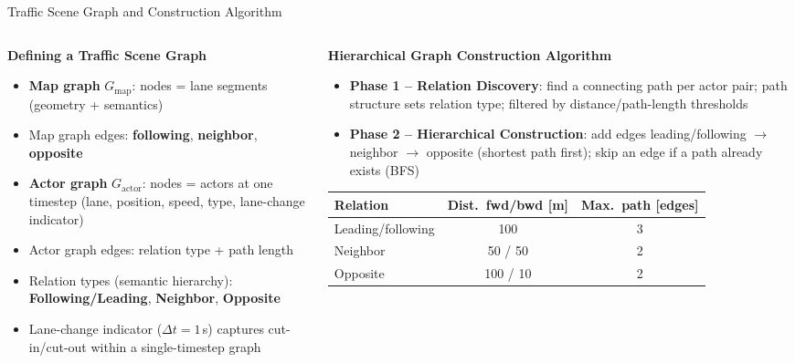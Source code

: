 \documentclass[aspectratio=169]{beamer}
\begin{document}
\begin{frame}{Traffic Scene Graph and Construction Algorithm}
\begin{columns}[t]
\begin{column}{0.5\textwidth}
\textbf{\footnotesize Defining a Traffic Scene Graph}
\begin{itemize}[itemsep=1pt,topsep=1pt,parsep=0pt]
    \scriptsize
    \item \textbf{Map graph} $G_{\text{map}}$: nodes = lane segments (geometry + semantics)
    \item Map graph edges: \textbf{following}, \textbf{neighbor}, \textbf{opposite}
    \item \textbf{Actor graph} $G_{\text{actor}}$: nodes = actors at one timestep (lane, position, speed, type, lane-change indicator)
    \item Actor graph edges: relation type + path length
    \item Relation types (semantic hierarchy): \textbf{Following/Leading}, \textbf{Neighbor}, \textbf{Opposite}
    \item Lane-change indicator ($\Delta t = 1$\,s) captures cut-in/cut-out within a single-timestep graph
\end{itemize}
\end{column}
\begin{column}{0.5\textwidth}
\textbf{\footnotesize Hierarchical Graph Construction Algorithm}
\begin{itemize}[itemsep=1pt,topsep=1pt,parsep=0pt]
    \scriptsize
    \item \textbf{Phase 1 -- Relation Discovery}: find a connecting path per actor pair; path structure sets relation type; filtered by distance/path-length thresholds
    \item \textbf{Phase 2 -- Hierarchical Construction}: add edges leading/following $\rightarrow$ neighbor $\rightarrow$ opposite (shortest path first); skip an edge if a path already exists (BFS)
\end{itemize}
\begin{table}
\centering
\tiny
\begin{tabular}{lcc}
\toprule
\textbf{Relation} & \textbf{Dist.\ fwd/bwd [m]} & \textbf{Max.\ path [edges]} \\
\midrule
Leading/following & 100 & 3 \\
Neighbor          & 50 / 50 & 2 \\
Opposite          & 100 / 10 & 2 \\
\bottomrule
\end{tabular}
\end{table}
\end{column}
\end{columns}
\end{frame}
\end{document}
